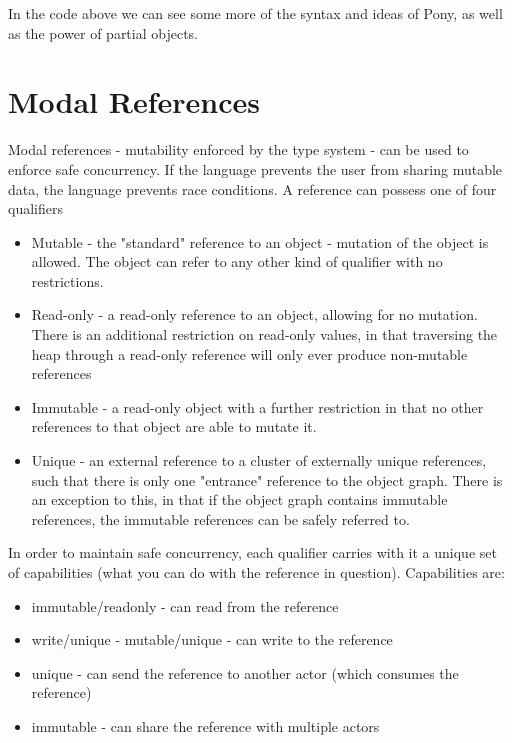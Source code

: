\documentclass[11pt,a4paper]{report}
\begin{document}
In the code above we can see some more of the syntax and ideas of Pony, as well as the power of partial objects.

\section{Modal References}
\label{sec:immutability}

Modal references - mutability enforced by the type system\cite{tschantz2005javari}\cite{zibin2007object}\cite{zibin2010ownership} - can be used to enforce safe concurrency.
If the language prevents the user from sharing mutable data, the language prevents race conditions.
A reference can possess one of four qualifiers\cite{microsoft2012}

\begin{itemize}
	\item Mutable - the "standard" reference to an object - mutation of the object is allowed.
		The object can refer to any other kind of qualifier with no restrictions.
	\item Read-only - a read-only reference to an object, allowing for no mutation.
		There is an additional restriction on read-only values, in that traversing the heap through a read-only reference will only ever produce non-mutable references
	\item Immutable - a read-only object with a further restriction in that no other references to that object are able to mutate it.
	\item Unique\cite{haller2010capabilities} - an external reference to a cluster of externally unique references, such that there is only one "entrance" reference to the object graph.
		There is an exception to this, in that if the object graph contains immutable references, the immutable references can be safely referred to.
\end{itemize}

In order to maintain safe concurrency, each qualifier carries with it a unique set of capabilities (what you can do with the reference in question).
Capabilities are:
\begin{itemize}[noitemsep]
	\item immutable/readonly - can read from the reference
	\item write/unique - mutable/unique - can write to the reference
	\item unique - can send the reference to another actor (which consumes the reference)
	\item immutable - can share the reference with multiple actors
\end{itemize}
\end{document}
